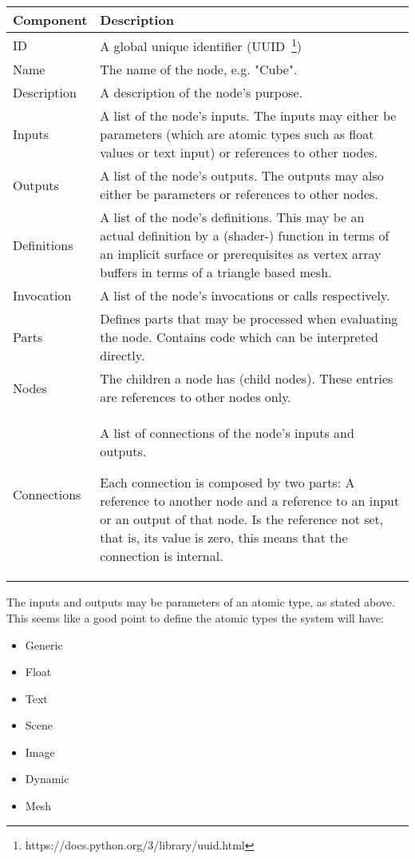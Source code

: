 \documentclass[
    a4paper,      %
    10pt,         %
    openright,    %
    notitlepage,  %
    parskip=half, %
]{scrreprt}       %
\newcommand{\ra}[1]{\renewcommand{\arraystretch}{#1}}
\theoremstyle{definition}                    %
\begin{document}
\begin{table*}\centering
  \ra{1.3}
  \begin{tabularx}{\textwidth}{@{}lX@{}}
    \toprule
    Component & Description \\
    \hline
    ID & A global unique identifier
         (UUID~\footnote{https://docs.python.org/3/library/uuid.html}) \\
    Name & The name of the node, e.g. "Cube". \\
    Description & A description of the node's purpose. \\
    Inputs & A list of the node's inputs. The inputs may either be parameters
             (which are atomic types such as float values or text input) or
             references to other nodes. \\
    Outputs & A list of the node's outputs. The outputs may also either be
              parameters or references to other nodes. \\
    Definitions & A list of the node's definitions. This may be an actual
                 definition by a (shader-) function in terms of an implicit
                 surface or prerequisites as vertex array buffers in terms of a
                 triangle based mesh. \\
    Invocation & A list of the node's invocations or calls respectively.\\
    Parts & Defines parts that may be processed when evaluating the node.
            Contains code which can be interpreted directly. \\
    Nodes & The children a node has (child nodes). These entries are
            references to other nodes only. \\
    Connections & A list of connections of the node's inputs and outputs.

                  Each connection is composed by two parts: A reference to another
                  node and a reference to an input or an output of that node. Is
                  the reference not set, that is, its value is zero, this means
                  that the connection is internal. \\
    \bottomrule
  \end{tabularx}
\end{table*}

The inputs and outputs may be parameters of an atomic type, as stated above. This
seems like a good point to define the atomic types the system will have:

\begin{itemize}
  \item{Generic}
  \item{Float}
  \item{Text}
  \item{Scene}
  \item{Image}
  \item{Dynamic}
  \item{Mesh}
\end{itemize}
\end{document}
